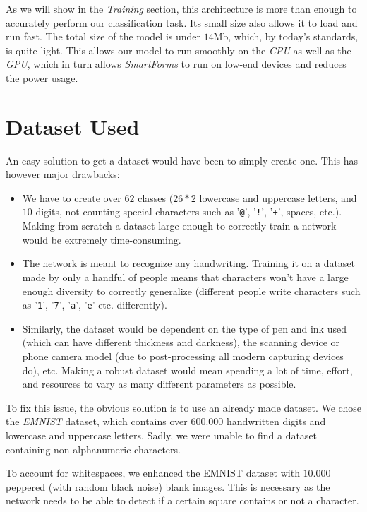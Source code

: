 \documentclass[11pt, a4paper]{report}
\def\code#1{\texttt{#1}}
\begin{document}
As we will show in the \textit{Training} section, this architecture is more than enough to accurately perform our classification task. Its small size also allows it to load and run fast. The total size of the model is under $14$Mb, which, by today's standards, is quite light. This allows our model to run smoothly on the \textit{CPU} as well as the \textit{GPU}, which in turn allows \textit{SmartForms} to run on low-end devices and reduces the power usage. 

\section{Dataset Used}

An easy solution to get a dataset would have been to simply create one. This has however major drawbacks:
\begin{itemize}
	\item We have to create over $62$ classes ($26*2$ lowercase and uppercase letters, and $10$ digits, not counting special characters such as '\code{@}', '\code{!}', '\code{+}', spaces, etc.). Making from scratch a dataset large enough to correctly train a network would be extremely time-consuming.
	\item The network is meant to recognize any handwriting. Training it on a dataset made by only a handful of people means that characters won't have a large enough diversity to correctly generalize (different people write characters such as '\code{1}', '\code{7}', '\code{a}', '\code{e}' etc. differently).
	\item Similarly, the dataset would be dependent on the type of pen and ink used (which can have different thickness and darkness), the scanning device or phone camera model (due to post-processing all modern capturing devices do), etc. Making a robust dataset would mean spending a lot of time, effort, and resources to vary as many different parameters as possible. 
\end{itemize}

To fix this issue, the obvious solution is to use an already made dataset.
We chose the \textit{EMNIST} \cite{emnist} dataset, which contains over $600.000$ handwritten digits and lowercase and uppercase letters. Sadly, we were unable to find a dataset containing non-alphanumeric characters.

To account for whitespaces, we enhanced the EMNIST dataset with $10.000$ peppered (with random black noise) blank images. This is necessary as the network needs to be able to detect if a certain square contains or not a character.
\end{document}
